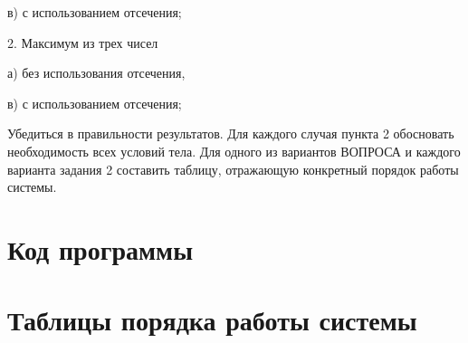 \documentclass[a4paper, 14pt, unknownkeysallowed]{extreport}
\begin{document}
в) с использованием отсечения;

2. Максимум из трех чисел

а) без использования отсечения,

в) с использованием отсечения;

Убедиться в правильности результатов.
Для каждого случая пункта 2 обосновать необходимость всех условий тела.
Для одного из вариантов ВОПРОСА и каждого варианта задания 2 составить
таблицу, отражающую конкретный порядок работы системы.

\clearpage
\section{Код программы}
\clearpage
\section{Таблицы порядка работы системы}


\end{document}
